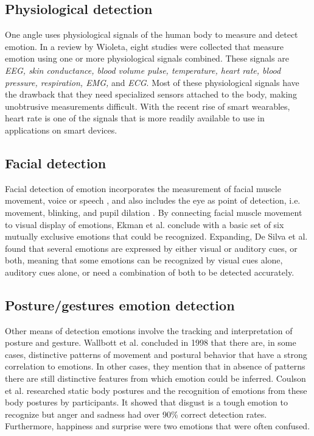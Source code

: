 \documentclass{sig-alternate}
\begin{document}
\subsection{Physiological detection} %
\label{sub:physiology}
One angle uses physiological signals of the human body to measure and detect emotion. In a review by Wioleta\cite{Wioleta2013}, eight studies were collected that measure emotion using one or more physiological signals combined. These signals are \textit{EEG, skin conductance, blood volume pulse, temperature, heart rate, blood pressure, respiration, EMG,} and \textit{ECG}. Most of these physiological signals have the drawback that they need specialized sensors attached to the body, making unobtrusive measurements difficult. With the recent rise of smart wearables, heart rate is one of the signals that is more readily available to use in applications on smart devices.

\subsection{Facial detection} %
\label{sub:facial_detection}
Facial detection of emotion incorporates the measurement of facial muscle movement, voice or speech \cite{Ververidis2004}, and also includes the eye as point of detection, i.e. movement, blinking, and pupil dilation \cite{Soleymani2015}. By connecting facial muscle movement to visual display of emotions, Ekman et al. \cite{Ekman1969} conclude with a basic set of six mutually exclusive emotions that could be recognized. Expanding, De Silva et al. \cite{Silva1997} found that several emotions are expressed by either visual or auditory cues, or both, meaning that some emotions can be recognized by visual cues alone, auditory cues alone, or need a combination of both to be detected accurately.

\subsection{Posture/gestures emotion detection}
Other means of detection emotions involve the tracking and interpretation of posture and gesture. Wallbott et al. \cite{Wallbott1998} concluded in 1998 that there are, in some cases, distinctive patterns of movement and postural behavior that have a strong correlation to emotions. In other cases, they mention that in absence of patterns there are still distinctive features from which emotion could be inferred. Coulson et al. \cite{Coulson2004} researched static body postures and the recognition of emotions from these body postures by participants. It showed that disgust is a tough emotion to recognize but anger and sadness had over 90\% correct detection rates. Furthermore, happiness and surprise were two emotions that were often confused. 
\end{document}
